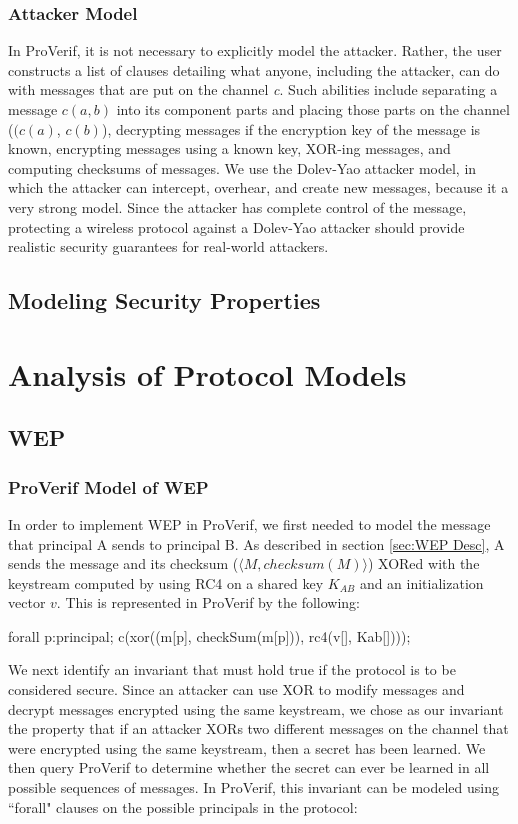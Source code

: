 \documentclass[11pt, twocolumn]{article} %
\begin{document}
{\subsubsection{Attacker Model}
In ProVerif, it is not necessary to explicitly model the attacker.  Rather, the user constructs a list of clauses detailing what anyone, including the attacker, can do with messages that are put on the channel \textit{c}.  Such abilities include separating a message $c(a,b)$ into its component parts and placing those parts on the channel ($(c(a)$, $c(b)$), decrypting messages if the encryption key of the message is known, encrypting messages using a known key, XOR-ing messages, and computing checksums of messages.  We use the Dolev-Yao attacker model, in which the attacker can intercept, overhear, and create new messages, because it a very strong model.  Since the attacker has complete control of the message, protecting a wireless protocol against a Dolev-Yao attacker should provide realistic security guarantees for real-world attackers. 

\subsection{Modeling Security Properties}

\section{Analysis of Protocol Models}
\label{sec:analysis}
\subsection{WEP}
\subsubsection{ProVerif Model of WEP}
In order to implement WEP in ProVerif, we first needed to model the message that principal A sends to principal B.  As described in section \ref{sec:WEP Desc}, A sends the message and its checksum ($\langle M, checksum(M)\rangle$) XORed with the keystream computed by using RC4 on a shared key $K_{AB}$ and an initialization vector $v$.  This is represented in ProVerif by the following:
\begin{verbatimtab}[4]
forall p:principal; 
	c(xor((m[p], checkSum(m[p])), 
		rc4(v[], Kab[])));
\end{verbatimtab}


We next identify an invariant that must hold true if the protocol is to be considered secure.  Since an attacker can use XOR to modify messages and decrypt messages encrypted using the same keystream, we chose as our invariant the property that if an attacker XORs two different messages on the channel that were encrypted using the same keystream, then a secret has been learned.  We then query ProVerif to determine whether the secret can ever be learned in all possible sequences of messages.  In ProVerif, this invariant can be modeled using ``forall" clauses on the possible principals in the protocol:

}
\end{document}
